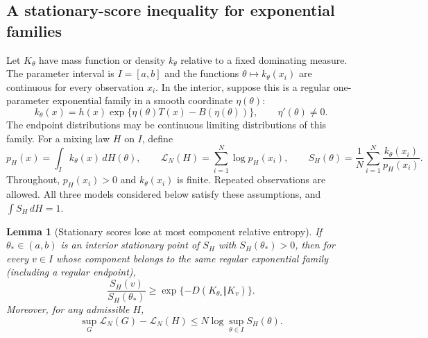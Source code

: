 \documentclass[11pt,a4paper]{article}
\newtheorem{lemma}[theorem]{Lemma}
\theoremstyle{definition}
\theoremstyle{remark}
\numberwithin{equation}{section}
\begin{document}
\subsection{A stationary-score inequality for exponential families}

Let $K_\theta$ have mass function or density $k_\theta$ relative to a
fixed dominating measure. The parameter interval is $I=[a,b]$ and
the functions $\theta\mapsto k_\theta(x_i)$ are continuous for every
observation $x_i$. In the interior, suppose this is a regular
one-parameter exponential family in a smooth coordinate $\eta(\theta)$:
\[
 k_\theta(x)=h(x)
     \exp\{\eta(\theta)T(x)-B(\eta(\theta))\},\qquad
 \eta'(\theta)\ne0.
\]
The endpoint distributions may be continuous limiting distributions of
this family. For a mixing law $H$ on $I$, define
\[
 p_H(x)=\int_I k_\theta(x)\,dH(\theta),\qquad
 \mathcal L_N(H)=\sum_{i=1}^N\log p_H(x_i),\qquad
 S_H(\theta)=\frac1N\sum_{i=1}^N
                         \frac{k_\theta(x_i)}{p_H(x_i)}.
\]
Throughout, $p_H(x_i)>0$ and $k_\theta(x_i)$ is finite. Repeated
observations are allowed. All three models considered below satisfy
these assumptions, and $\int S_H\,dH=1$.

\begin{lemma}[Stationary scores lose at most component relative entropy]
\label{fg:stationary}
If $\theta_*\in(a,b)$ is an interior stationary point of $S_H$ with
$S_H(\theta_*)>0$, then for every $v\in I$ whose component belongs
to the same regular exponential family (including a regular endpoint),
\begin{equation}\label{fg:jensen}
 \frac{S_H(v)}{S_H(\theta_*)}
       \ge \exp\{-D(K_{\theta_*}\Vert K_v)\}.
\end{equation}
Moreover, for any admissible $H$,
\begin{equation}\label{fg:scoregap}
 \sup_G\mathcal L_N(G)-\mathcal L_N(H)
                  \le N\log\sup_{\theta\in I}S_H(\theta).
\end{equation}
\end{lemma}
\end{document}
